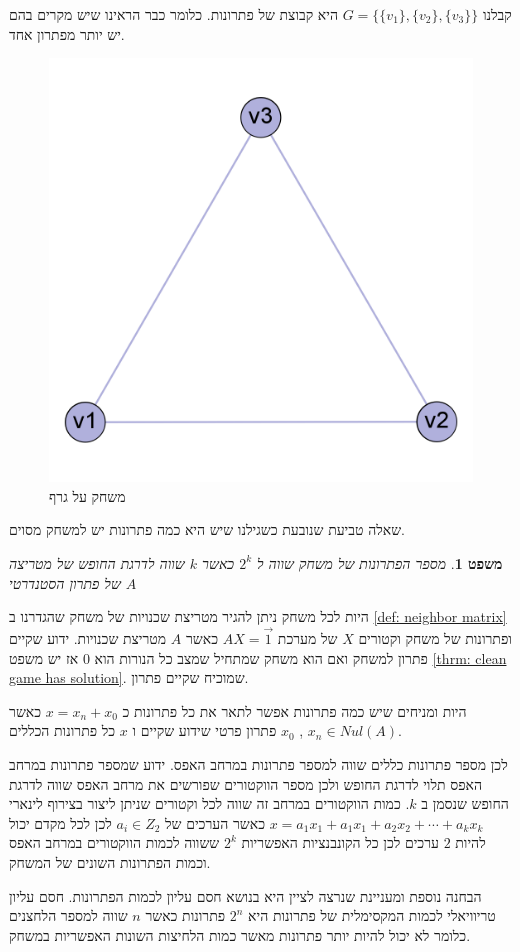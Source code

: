 \documentclass[12pt,twoside]{article}
\newtheorem{theorem}{משפט}[section]
\begin{document}
קבלנו 
$G = \{\{v_1\}, \{v_2\}, \{v_3\} \}$
היא קבוצת של פתרונות.
כלומר כבר הראינו שיש מקרים בהם יש יותר מפתרון אחד.

\begin{figure}[ht]
    \caption{משחק על גרף}
    \label{fig: clic 3 node graph game} 
    \unsethebrew
    \centering
    \includegraphics[width=.5\textwidth,height=.5\textheight,keepaspectratio]{images/clic_graph_3_node.png}
\end{figure}
\sethebrew

שאלה טביעת שנובעת כשגילנו שיש היא כמה פתרונות יש למשחק מסוים.

\begin{theorem}
    מספר הפתרונות של משחק 
    שווה ל 
    $2^{k}$
    כאשר 
    $k$
    שווה לדרגת החופש של מטריצה
    $A$
    של פתרון הסטנדרטי
\end{theorem}

היות לכל משחק ניתן להגיר מטריצת שכנויות של משחק שהגדרנו 
ב
\ref{def: neighbor matrix}
ופתרונות של משחק וקטורים
$X$
של מערכת
$A X = \vec{1}$
כאשר 
$A$
מטריצת שכנויות.
ידוע שקיים פתרון למשחק ואם הוא משחק שמתחיל שמצב כל הנורות הוא
$0$
אז יש משפט 
\ref{thrm: clean game has solution}.
שמוכיח שקיים פתרון.

היות ומניחים שיש כמה פתרונות אפשר לתאר את כל פתרונות כ
$x = x_n + x_0$
כאשר 
$x_n \in Nul(A)$ ,
$x_0$ 
פתרון פרטי שידוע שקיים 
ו
$x$
כל פתרונות הכללים.

לכן מספר פתרונות כללים שווה למספר פתרונות במרחב האפס.
ידוע שמספר פתרונות במרחב האפס תלוי לדרגת החופש ולכן מספר הווקטורים שפורשים
את מרחב האפס שווה לדרגת החופש שנסמן ב
$k$.
כמות הווקטורים במרחב זה שווה לכל וקטורים שניתן ליצור בצירוף לינארי 
$x = a_1 x_1 + a_1 x_1 + a_2 x_2 + \cdots + a_k x_k$
כאשר הערכים של
$a_i \in Z_2$
לכן 
לכל מקדם יכול להיות
$2$
ערכים
לכן כל הקונבנציות האפשריות 
$2^k$
ששווה
לכמות הווקטורים 
במרחב האפס וכמות הפתרונות השונים של המשחק.

הבחנה נוספת ומעניינת שנרצה לציין היא בנושא חסם עליון לכמות הפתרונות.
חסם עליון טריוויאלי לכמות המקסימלית של פתרונות היא 
$2^n$
פתרונות כאשר
$n$
שווה למספר הלחצנים כלומר לא יכול להיות יותר פתרונות מאשר כמות הלחיצות השונות האפשריות במשחק.
\end{document}
